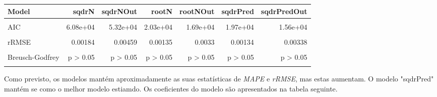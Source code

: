 \documentclass[justified, 11pt]{scrartcl}\usepackage[]{graphicx}\usepackage[]{xcolor}
\newenvironment{knitrout}{}{} %
\begin{document}
\begin{knitrout}
\begin{table}
\begin{tabular}{l|r|r|r|r|r|r}
\hline
Model & sqdrN & sqdrNOut & rootN & rootNOut & sqdrPred & sqdrPredOut\\
\hline
\cellcolor{gray!6}{R2} & \cellcolor{gray!6}{0.954} & \cellcolor{gray!6}{0.939} & \cellcolor{gray!6}{0.361} & \cellcolor{gray!6}{0.383} & \cellcolor{gray!6}{0.43} & \cellcolor{gray!6}{0.469}\\
\hline
AIC & 6.08e+04 & 5.32e+04 & 2.03e+04 & 1.69e+04 & 1.97e+04 & 1.56e+04\\
\hline
\cellcolor{gray!6}{MAPE} & \cellcolor{gray!6}{0.129} & \cellcolor{gray!6}{0.122} & \cellcolor{gray!6}{0.0882} & \cellcolor{gray!6}{0.0853} & \cellcolor{gray!6}{0.0863} & \cellcolor{gray!6}{0.0872}\\
\hline
rRMSE & 0.00184 & 0.00459 & 0.00135 & 0.0033 & 0.00134 & 0.00338\\
\hline
\cellcolor{gray!6}{Breusch-Pagan} & \cellcolor{gray!6}{p > 0.05} & \cellcolor{gray!6}{p > 0.05} & \cellcolor{gray!6}{p > 0.05} & \cellcolor{gray!6}{p > 0.05} & \cellcolor{gray!6}{p > 0.05} & \cellcolor{gray!6}{p > 0.05}\\
\hline
Breusch-Godfrey & p > 0.05 & p > 0.05 & p > 0.05 & p > 0.05 & p > 0.05 & p > 0.05\\
\hline
\cellcolor{gray!6}{Jarque-Bera} & \cellcolor{gray!6}{p < 0.05} & \cellcolor{gray!6}{p < 0.05} & \cellcolor{gray!6}{p < 0.05} & \cellcolor{gray!6}{p < 0.05} & \cellcolor{gray!6}{p < 0.05} & \cellcolor{gray!6}{p < 0.05}\\
\hline
\end{tabular}
\endgroup{}
\end{table}

\end{knitrout}
Como previsto, os modelos mantém aproximadamente as suas estatísticas de \textit{MAPE} e \textit{rRMSE}, mas estas aumentam. O modelo "sqdrPred" mantém se como o melhor modelo estiamdo.
Os coeficientes do modelo são apresentados na tabela seguinte.\\
\footnotesize
\end{document}
